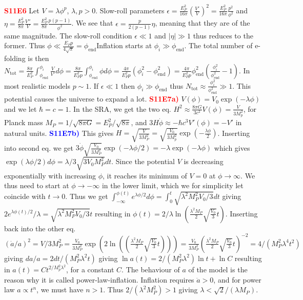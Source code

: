 \documentclass[landscape, a4paper,1pt,english]{article}
\begin{document}
{{{\begin{multicols}{5}
\textcolor{red}{\textbf{S11E6}} Let $V = \lambda \phi^p$, $\lambda, p>0$. Slow-roll parameters $\epsilon = \frac{E_P^2}{16\pi}\left(\frac{V'}{V}\right)^2 = \frac{E_P^2}{16\pi}\frac{p^2}{\phi^2}$ and $\eta = \frac{E_P^2}{8\pi}\frac{V''}{V} = \frac{E_P^2}{8\pi}\frac{p(p-1)}{\phi^2}$. We see that $\epsilon = \frac{p}{2(p-1)}\eta$, meaning that they are of the same magnitude. The slow-roll condition $\epsilon\ll1$ and $|\eta|\gg1$ thus reduces to the former. Thus $\phi\ll\frac{E_Pp}{4\sqrt{\pi}} = \phi_\text{end}$Inflation starts at $\phi_i\gg\phi_\text{end}$. The total number of e-folding is then $N_\text{tot} = \frac{8\pi}{E_P^2}\int_{\phi_\text{end}}^{\phi_i}\frac{V}{V'}d\phi = \frac{8\pi}{E_P^2p}\int_{\phi_\text{end}}^{\phi_i}\phi d\phi = \frac{4\pi}{E_P^2p}(\phi_i^2 - \phi_\text{end}^2) = \frac{4\pi}{E_P^2p}\phi_\text{end}^2(\frac{\phi_i^2}{\phi_\text{end}^2} - 1)$. In most realistic models $p\sim1$. If $\epsilon\ll1$ then $\phi_i\gg\phi_\text{end}$ thus $N_\text{tot}\approx\frac{\phi_i^2}{\phi_\text{end}^2}\gg 1$. This potential causes the universe to expand a lot.
\textcolor{red}{\textbf{S11E7a)}} $V(\phi) = V_0 \exp(-\lambda\phi)$ and we let $\hbar = c = 1$. In the SRA, we get the two eq. $H^2 \approx \frac{8\pi G}{3c^2}V(\phi) = \frac{V}{3M_p^2}$, for Planck mass $M_P = 1/\sqrt{8\pi G} = E_P^2/\sqrt{8\pi}$, and $3H\dot{\phi}\approx-\hbar c^3V'(\phi) = -V'$ in natural units.
\textcolor{blue}{\textbf{S11E7b)}} This gives $H = \sqrt{\frac{V}{3M_P^2}} = \sqrt{\frac{V_0}{3M_p^2}}\exp(-\frac{\lambda\phi}{2})$. Inserting into second eq. we get $3\dot{\phi}\sqrt{\frac{V_0}{3M_P^2}}\exp(-\lambda\phi/2) = -\lambda\exp(-\lambda\phi)$ which gives $\exp(\lambda\phi/2)d\phi = \lambda/3 \sqrt{3V_0M_P^2}dt$. Since the potential $V$ is decreasing exponentially with increasing $\phi$, it reaches its minimum of $V = 0$ at $\phi\to\infty$. We thus need to start at $\phi\to-\infty$ in the lower limit, which we for simplicity let coincide with $t\to0$. Thus we get $\int_{-\infty}^{\phi(t)}e^{\lambda\phi/2}d\phi = \int_{0}^{t}\sqrt{\lambda^2M_P^2V_0/3}dt$ giving $2e^{\lambda\phi(t)/2}/\lambda = \sqrt{\lambda^2M_P^2V_0/3}t$ resulting in $\phi(t) = 2/\lambda\ln(\frac{\lambda^2M_P}{2}\sqrt{\frac{V_0}{3}}t)$. Inserting back into the other eq. 
$(\dot{a}/a)^2 = V/3M_P^2 = \frac{V_0}{3M_P^2}\exp(2\ln((\frac{\lambda^2M_P}{2}\sqrt{\frac{V_0}{3}}t))) = \frac{V_0}{3M_P^2}\left(\frac{\lambda^2M_P}{2}\sqrt{\frac{V_0}{3}}t\right)^{-2} = 4/(M_P^2\lambda^4 t^2)$ giving $da/a = 2dt/(M_P^2\lambda^2 t)$ giving $\ln a(t) = 2/(M_P^2\lambda^2)\ln t + \ln C$ resulting in $a(t) = Ct^{2/M_p^2\lambda^2}$, for a constant $C$. The behaviour of $a$  of the model is the reason why it is called power-law-inflation. Inflation requires $\ddot{a}>0$, and for power law $a\propto t^n$, we must have $n>1$. Thus $2/(\lambda^2M_P^2)>1$ giving $\lambda < \sqrt{2}/(\lambda M_P)$.

\end{multicols}}}}
\end{document}
